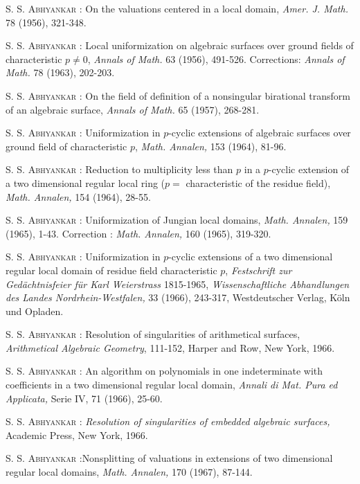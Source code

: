 \begin{thebibliography}{99}\pageoriginale
{} \textsc{S. S. Abhyankar :} On the valuations centered in a local domain, {\em Amer. J. Math.} 78 (1956), 321-348.

 \textsc{S. S. Abhyankar :} Local uniformization on algebraic surfaces over ground fields of characteristic $p\neq 0$, {\em Annals of Math.} 63 (1956), 491-526. Corrections: {\em Annals of Math.} 78 (1963), 202-203.

 \textsc{S. S. Abhyankar :} On the field of definition of a nonsingular birational transform of an algebraic surface, {\em Annals of Math.} 65 (1957), 268-281.

 \textsc{S. S. Abhyankar :} Uniformization in $p$-cyclic extensions of algebraic surfaces over ground field of characteristic $p$, {\em Math. Annalen,} 153 (1964), 81-96.

 \textsc{S. S. Abhyankar :} Reduction to multiplicity less than $p$ in a $p$-cyclic extension of a two dimensional regular local ring ($p={}$ characteristic of the residue field), {\em Math. Annalen,} 154 (1964), 28-55.

 \textsc{S. S. Abhyankar :} Uniformization of Jungian local domains, {\em Math. Annalen,} 159 (1965), 1-43. Correction : {\em Math. Annalen,} 160 (1965), 319-320.

 \textsc{S. S. Abhyankar :} Uniformization in $p$-cyclic extensions of a two dimensional regular local domain of residue field characteristic $p$, {\em Festschrift zur Ged\"achtnisfeier f\"ur Karl Weierstrass} 1815-1965, {\em Wissenschaftliche Abhandlungen des Landes Nordrhein-Westfalen,} 33 (1966), 243-317, Westdeutscher Verlag, K\"oln und Opladen.

 \textsc{S. S. Abhyankar :} Resolution of singularities of arithmetical surfaces, {\em Arithmetical Algebraic Geometry}, 111-152, Harper and Row, New York, 1966.

 \textsc{S. S. Abhyankar :} An algorithm on polynomials in one indeterminate with coefficients in a two dimensional regular local domain, {\em Annali di Mat. Pura ed Applicata,} Serie IV, 71 (1966), 25-60.

 \textsc{S. S. Abhyankar :} {\em Resolution of singularities of embedded algebraic surfaces,} Academic Press, New York, 1966.

 \textsc{S. S. Abhyankar :}\pageoriginale Nonsplitting of valuations in extensions of two dimensional regular local domains, {\em Math. Annalen,} 170 (1967), 87-144.


\end{thebibliography}
